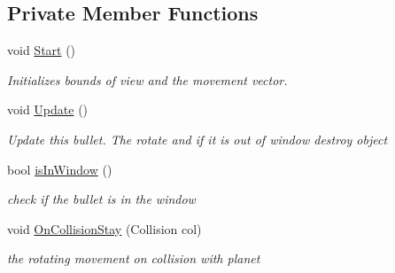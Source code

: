 \subsection*{Private Member Functions}
\begin{DoxyCompactItemize}
\item 
void \mbox{\hyperlink{class_bullet_movement_aedea440e001bde34585c344da0557b6e}{Start}} ()
\begin{DoxyCompactList}\small\item\em Initializes bounds of view and the movement vector. \end{DoxyCompactList}\item 
void \mbox{\hyperlink{class_bullet_movement_a95545abaf23c8a2120076127df594db3}{Update}} ()
\begin{DoxyCompactList}\small\item\em Update this bullet. The rotate and if it is out of window destroy object \end{DoxyCompactList}\item 
bool \mbox{\hyperlink{class_bullet_movement_ab6f9452d6eefa893c167e52c285d7ce9}{is\+In\+Window}} ()
\begin{DoxyCompactList}\small\item\em check if the bullet is in the window \end{DoxyCompactList}\item 
void \mbox{\hyperlink{class_bullet_movement_a331fc1849938f5faf8aec9999f288d4c}{On\+Collision\+Stay}} (Collision col)
\begin{DoxyCompactList}\small\item\em the rotating movement on collision with planet \end{DoxyCompactList}\end{DoxyCompactItemize}
